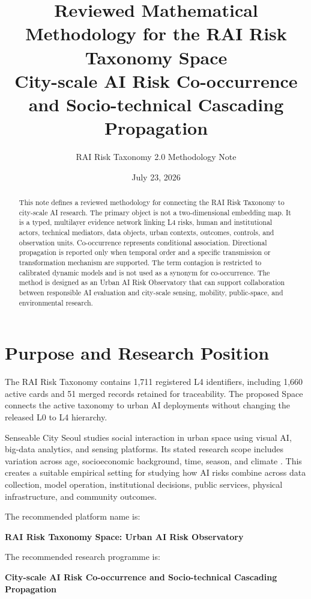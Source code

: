 \documentclass[11pt,a4paper]{article}
\title{\textbf{Reviewed Mathematical Methodology for the RAI Risk Taxonomy Space}\\
\large City-scale AI Risk Co-occurrence and Socio-technical Cascading Propagation}
\author{RAI Risk Taxonomy 2.0 Methodology Note}
\date{July 23, 2026}
\begin{document}
\maketitle

\begin{abstract}
This note defines a reviewed methodology for connecting the RAI Risk Taxonomy to city-scale AI research. The primary object is not a two-dimensional embedding map. It is a typed, multilayer evidence network linking L4 risks, human and institutional actors, technical mediators, data objects, urban contexts, outcomes, controls, and observation units. Co-occurrence represents conditional association. Directional propagation is reported only when temporal order and a specific transmission or transformation mechanism are supported. The term contagion is restricted to calibrated dynamic models and is not used as a synonym for co-occurrence. The method is designed as an Urban AI Risk Observatory that can support collaboration between responsible AI evaluation and city-scale sensing, mobility, public-space, and environmental research.
\end{abstract}

\section{Purpose and Research Position}

The RAI Risk Taxonomy contains 1,711 registered L4 identifiers, including 1,660 active cards and 51 merged records retained for traceability. The proposed Space connects the active taxonomy to urban AI deployments without changing the released L0 to L4 hierarchy.

Senseable City Seoul studies social interaction in urban space using visual AI, big-data analytics, and sensing platforms. Its stated research scope includes variation across age, socioeconomic background, time, season, and climate \cite{senseableseoul}. This creates a suitable empirical setting for studying how AI risks combine across data collection, model operation, institutional decisions, public services, physical infrastructure, and community outcomes.

The recommended platform name is:
\begin{center}
\textbf{RAI Risk Taxonomy Space: Urban AI Risk Observatory}
\end{center}

The recommended research programme is:
\begin{center}
\textbf{City-scale AI Risk Co-occurrence and Socio-technical Cascading Propagation}
\end{center}
\end{document}
